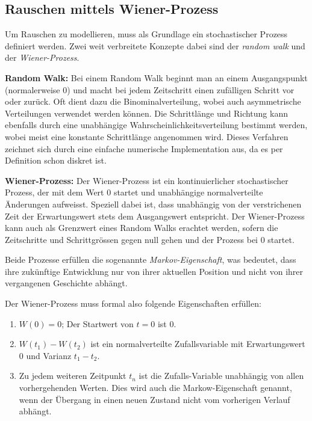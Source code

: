 \subsection{Rauschen mittels Wiener-Prozess\label{brown:Rauschen:RandomWalkWiener}}

Um Rauschen zu modellieren, muss als Grundlage ein stochastischer Prozess definiert werden. Zwei weit verbreitete Konzepte dabei sind der \textit{random walk} und der \textit{Wiener-Prozess}.

\begin{definition}\textbf{Random Walk:}
	\label{randomWalk}
	Bei einem Random Walk beginnt man an einem Ausgangspunkt (normalerweise 0) und macht bei jedem Zeitschritt einen zufälligen Schritt vor oder zurück. Oft dient dazu die Binominalverteilung, wobei auch asymmetrische Verteilungen verwendet werden können. Die Schrittlänge und Richtung kann ebenfalls durch eine unabhängige Wahrscheinlichkeitsverteilung bestimmt werden, wobei meist eine konstante Schrittlänge angenommen wird. Dieses Verfahren zeichnet sich durch eine einfache numerische Implementation aus, da es per Definition schon diskret ist.
\end{definition}

\begin{definition}\textbf{Wiener-Prozess:}
	\label{wienerprozess}
	Der Wiener-Prozess ist ein kontinuierlicher stochastischer Prozess, der mit dem Wert 0 startet und unabhängige normalverteilte Änderungen aufweisst. Speziell dabei ist, dass unabhängig von der verstrichenen Zeit der Erwartungswert stets dem Ausgangswert entspricht. Der Wiener-Prozess kann auch als Grenzwert eines Random Walks erachtet werden, sofern die Zeitschritte und Schrittgrössen gegen null gehen und der Prozess bei 0 startet. 
\end{definition}

Beide Prozesse erfüllen die sogenannte \textit{Markov-Eigenschaft}, was bedeutet, dass ihre zukünftige Entwicklung nur von ihrer aktuellen Position und nicht von ihrer vergangenen Geschichte abhängt.

Der Wiener-Prozess muss formal also folgende Eigenschaften erfüllen: 

\begin{enumerate}
	\item $ W(0) = 0 $; Der Startwert von $ t = 0 $ ist 0.
	\item $ W(t_{1}) - W(t_{2}) $ ist ein normalverteilte Zufallsvariable mit Erwartungswert 0 und Varianz $ t_{1} - t_{2} $.
	\item Zu jedem weiteren Zeitpunkt $ t_{n} $ ist die Zufalls-Variable unabhängig von allen vorhergehenden Werten. Dies wird auch die Markow-Eigenschaft genannt, wenn der Übergang in einen neuen Zustand nicht vom vorherigen Verlauf abhängt.
\end{enumerate}

